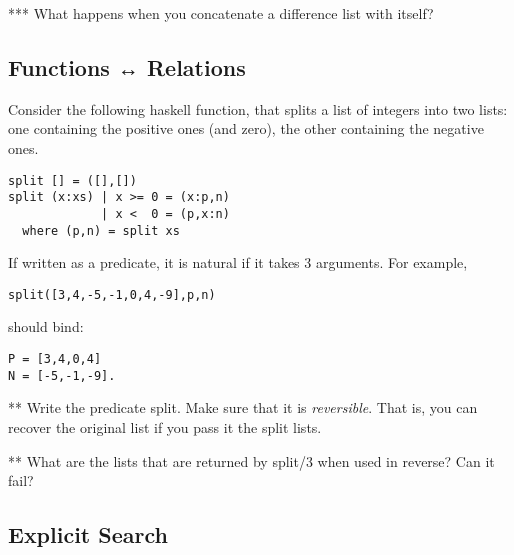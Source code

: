 \documentclass{article}
\newcounter{question}
\newcommand{\answer}[1]{}
\begin{document}
\begin{question}{***}
What happens when you concatenate a difference list with itself?
\answer{The difference list will contain circular, infinite lists.}
\end{question}





\subsection{Functions ↔ Relations}

Consider the following haskell function, that splits a list of
integers into two lists: one containing the positive ones (and zero),
the other containing the negative ones.
\begin{verbatim}
split [] = ([],[])
split (x:xs) | x >= 0 = (x:p,n)
             | x <  0 = (p,x:n)
  where (p,n) = split xs        
\end{verbatim}

If written as a predicate, it is natural if it takes 3 arguments. For example,

\begin{verbatim}
split([3,4,-5,-1,0,4,-9],p,n)
\end{verbatim}

should bind:

\begin{verbatim}
P = [3,4,0,4]
N = [-5,-1,-9].
\end{verbatim}


\begin{question}{**}
    Write the predicate \textsf{split}. Make sure that it is \emph{reversible}. That is,
    you can recover the original list if you pass it the split lists.
\answer{
\begin{prolog}
split([],[],[]).
split([X|A],[X|P],N) :- X >= 0, split(A,P,N).
split([X|A],P,[X|N]) :- X <  0, split(A,P,N).
\end{prolog}
}
\end{question}    

\begin{question}{**}
    What are the lists that are returned by \textsf{split/3} when used in reverse? Can it fail?
\answer{All the possible interleavings of the inputs. If a number of the wrong class is
in either of the inputs, it will fail.}
\end{question}

\subsection{Explicit Search}
\end{document}

